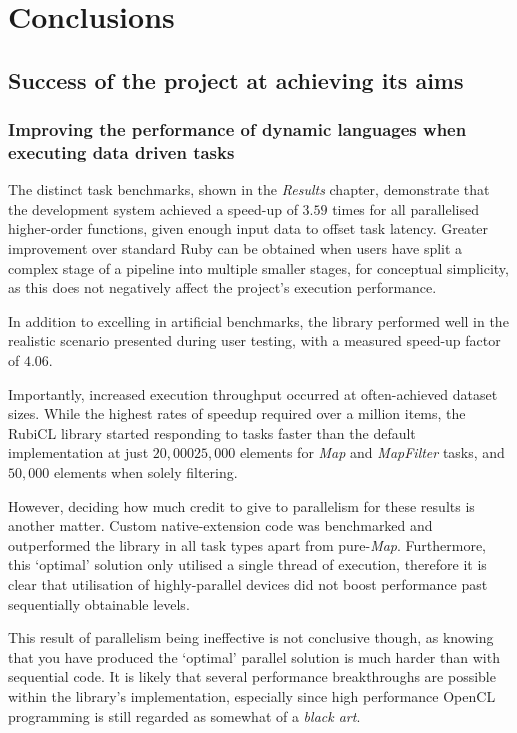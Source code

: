 \chapter{Conclusions}
\section{Success of the project at achieving its aims}
\subsection{Improving the performance of dynamic languages when executing data driven tasks}
The distinct task benchmarks, shown in the \emph{Results} chapter, demonstrate that the development system achieved a speed-up of $3.5$\textendash$9$ times for all parallelised higher-order functions, given enough input data to offset task latency.
Greater improvement over standard Ruby can be obtained when users have split a complex stage of a pipeline into multiple smaller stages, for conceptual simplicity, as this does not negatively affect the project's execution performance.

In addition to excelling in artificial benchmarks, the library performed well in the realistic scenario presented during user testing, with a measured speed-up factor of $4.06$.

Importantly, increased execution throughput occurred at often-achieved dataset sizes. While the highest rates of speedup required over a million items, the RubiCL library started responding to tasks faster than the default implementation at just $20,000$\textendash$25,000$ elements for \emph{Map} and \emph{MapFilter} tasks, and $50,000$ elements when solely filtering.

However, deciding how much credit to give to parallelism for these results is another matter. Custom native-extension code was benchmarked and outperformed the library in all task types apart from pure-\emph{Map}. Furthermore, this `optimal' solution only utilised a single thread of execution, therefore it is clear that utilisation of highly-parallel devices did not boost performance past sequentially obtainable levels.

This result of parallelism being ineffective is not conclusive though, as knowing that you have produced the `optimal' parallel solution is much harder than with sequential code. It is likely that several performance breakthroughs are possible within the library's implementation, especially since high performance \ac{OpenCL} programming is still regarded as somewhat of a \emph{black art}.

